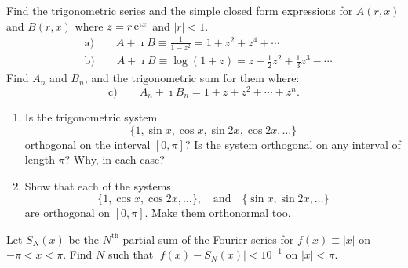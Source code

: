 {%
\begin{Exercise}
  Find the trigonometric series and the simple closed form expressions for
  $A(r,x)$ and $B(r,x)$ where $z = r \mathop{\mathrm{e}}\nolimits^{\imath x}$ and 
  $|r| < 1$.
  \begin{align*}
    &\mathrm{a}) \qquad
    A + \imath B \equiv \frac{1}{1-z^2} = 1 + z^2 + z^4 + \cdots \\
    &\mathrm{b}) \qquad
    A + \imath B \equiv \log(1 + z) = z - \frac{1}{2} z^2 + \frac{1}{3} z^3 - \cdots
  \end{align*}
  Find $A_n$ and $B_n$, and the trigonometric sum for them where:
  \[
  \mathrm{c}) \qquad
  A_n + \imath B_n = 1 + z + z^2 + \cdots + z^n.
  \]
\end{Exercise}





\begin{Exercise}
  \begin{enumerate}
  \item
    Is the trigonometric system
    \[
    \{ 1, \sin x, \cos x, \sin 2x, \cos 2x, \ldots \}
    \]
    orthogonal on the interval $[0,\pi]$?  Is the system orthogonal on any 
    interval of length $\pi$?  Why, in each case?
  \item
    Show that each of the systems
    \[
    \{ 1, \cos x, \cos 2x, \ldots \}, \quad \mathrm{and} \quad
    \{ \sin x, \sin 2x, \ldots \}
    \]
    are orthogonal on $[0,\pi]$.  Make them orthonormal too.
  \end{enumerate}
\end{Exercise}




\begin{Exercise}
  Let $S_N(x)$ be the $N^{\mathrm{th}}$ partial sum of the Fourier series for
  $f(x) \equiv |x|$ on $-\pi < x < \pi$.  Find $N$ such that 
  $|f(x) - S_N(x)| < 10^{-1}$ on $|x| < \pi$.
\end{Exercise}





}
